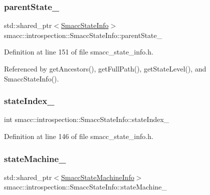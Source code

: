 \subsubsection{\texorpdfstring{parent\+State\+\_\+}{parentState\_}}
{\footnotesize\ttfamily std\+::shared\+\_\+ptr$<$\hyperlink{classsmacc_1_1introspection_1_1SmaccStateInfo}{Smacc\+State\+Info}$>$ smacc\+::introspection\+::\+Smacc\+State\+Info\+::parent\+State\+\_\+}



Definition at line 151 of file smacc\+\_\+state\+\_\+info.\+h.



Referenced by get\+Ancestors(), get\+Full\+Path(), get\+State\+Level(), and Smacc\+State\+Info().

\mbox{\label{classsmacc_1_1introspection_1_1SmaccStateInfo_a2354fa7abf158f0c29ab71c3125c9801}} 
\subsubsection{\texorpdfstring{state\+Index\+\_\+}{stateIndex\_}}
{\footnotesize\ttfamily int smacc\+::introspection\+::\+Smacc\+State\+Info\+::state\+Index\+\_\+}



Definition at line 146 of file smacc\+\_\+state\+\_\+info.\+h.

\mbox{\label{classsmacc_1_1introspection_1_1SmaccStateInfo_a74685e4540842ee292a80a1db44818bb}} 
\subsubsection{\texorpdfstring{state\+Machine\+\_\+}{stateMachine\_}}
{\footnotesize\ttfamily std\+::shared\+\_\+ptr$<$\hyperlink{classsmacc_1_1introspection_1_1SmaccStateMachineInfo}{Smacc\+State\+Machine\+Info}$>$ smacc\+::introspection\+::\+Smacc\+State\+Info\+::state\+Machine\+\_\+}



